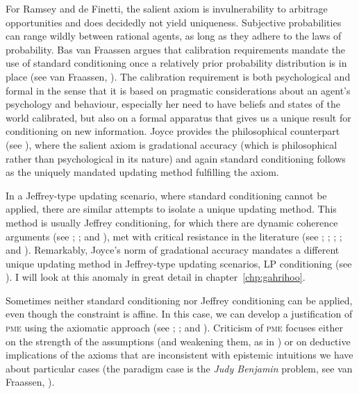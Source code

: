 \documentclass[phd,12pt,oneside]{ubcthesis}
\begin{document}
For Ramsey and de Finetti, the salient axiom is invulnerability to
arbitrage opportunities and does decidedly not yield uniqueness.
Subjective probabilities can range wildly between rational agents, as
long as they adhere to the laws of probability. Bas van Fraassen
argues that calibration requirements mandate the use of standard
conditioning once a relatively prior probability distribution is in
place (see van Fraassen, ). The calibration
requirement is both psychological and formal in the sense that it is
based on pragmatic considerations about an agent's psychology and
behaviour, especially her need to have beliefs and states of the world
calibrated, but also on a formal apparatus that gives us a unique
result for conditioning on new information. Joyce provides the
philosophical counterpart (see ), where the
salient axiom is gradational accuracy (which is philosophical rather
than psychological in its nature) and again standard conditioning
follows as the uniquely mandated updating method fulfilling the axiom.

In a Jeffrey-type updating scenario, where standard conditioning
cannot be applied, there are similar attempts to isolate a unique
updating method. This method is usually Jeffrey conditioning, for
which there are dynamic coherence arguments (see
; ; and
), met with critical resistance in the literature
(see ; ;
; ; and
). Remarkably, Joyce's norm of gradational
accuracy mandates a different unique updating method in Jeffrey-type
updating scenarios, LP conditioning (see
). I will look at this anomaly in
great detail in chapter~\ref{chp:gahrihoo}.

Sometimes neither standard conditioning nor Jeffrey conditioning can
be applied, even though the constraint is affine. In this case, we can
develop a justification of \textsc{pme} using the axiomatic approach
(see ; ; and
). Criticism of \textsc{pme} focuses either on
the strength of the assumptions (and weakening them, as in
) or on deductive implications of the axioms that
are inconsistent with epistemic intuitions we have about particular
cases (the paradigm case is the \emph{Judy Benjamin} problem, see van
Fraassen, ). 
\end{document}
